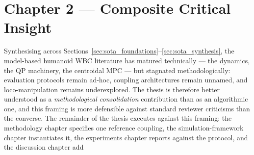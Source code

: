 \section*{Chapter 2 --- Composite Critical Insight}

Synthesising across Sections~\ref{sec:sota_foundations}--\ref{sec:sota_synthesis},
the model-based humanoid WBC literature has matured technically --- the
dynamics, the QP machinery, the centroidal MPC --- but stagnated
methodologically: evaluation protocols remain ad-hoc, coupling
architectures remain unnamed, and loco-manipulation remains
underexplored. The thesis is therefore better understood as a
\emph{methodological consolidation} contribution than as an algorithmic
one, and this framing is more defensible against standard reviewer
criticisms than the converse. The remainder of the thesis executes
against this framing: the methodology chapter specifies one reference
coupling, the simulation-framework chapter instantiates it, the
experiments chapter reports against the protocol, and the discussion
chapter add